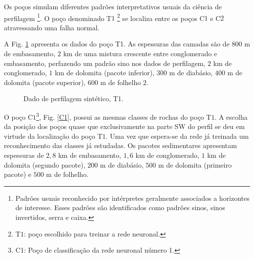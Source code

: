 Os poços simulam diferentes padrões interpretativos usuais da ciência de perfilagem \footnote{Padrões usuais reconhecido por intérpretes geralmente associados a horizontes de interesse. Esses padrões são identificados como padrões sinos, sinos invertidos, serra e caixa.}. O poço denominado T$1$ \footnote{T$1$: poço escolhido para treinar a rede neuronal.} se localiza entre os poços C$1$ e C$2$ atravessando uma falha normal. 

A Fig. \ref{T1} apresenta os dados do poço T1. As espessuras das camadas são de $800$ m de embasamento, $2$ km de uma mistura crescente entre conglomerado e embasamento, perfazendo um padrão sino nos dados de perfilagem, $2$ km de conglomerado, $1$ km de dolomita (pacote inferior), $300$ m de diabásio, $400$ m de dolomita (pacote superior), $600$ m de folhelho $2$. 

\begin{figure}[H]
	\centering
	\setlength{\fboxsep}{8pt}
	\setlength{\fboxrule}{0.1pt}
	\caption{Dado de perfilagem sintético, T1.}
	\label{T1}
\end{figure}

O poço C$1$\footnote{C1: Poço de classificação da rede neuronal número 1.}, Fig. \ref{C1}, possui as mesmas classes de rochas do poço T$1$. A escolha da posição dos poços quase que exclusivamente na parte SW do perfil se deu em virtude da localização do poço T$1$. Uma vez que espera-se da rede já treinada um reconhecimento das classes já estudadas. Os pacotes sedimentares apresentam espessuras de $2,8$ km de embasamento, $1,6$ km de conglomerado, $1$ km de dolomita (segundo pacote), $200$ m de diabásio, $500$ m de dolomita (primeiro pacote) e $500$ m de folhelho. 

